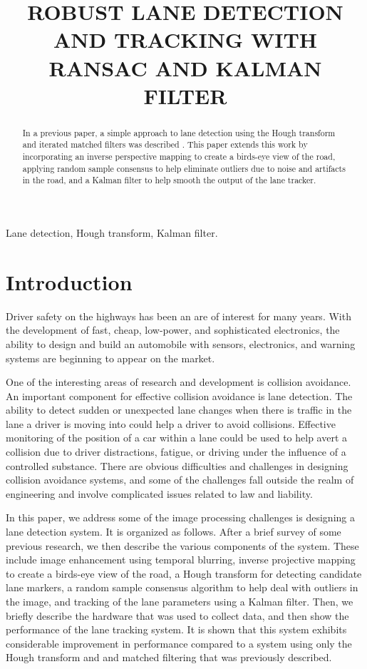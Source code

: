 \documentclass{article}
\title{ROBUST LANE DETECTION AND TRACKING WITH RANSAC AND KALMAN FILTER}
\begin{document}
%
\maketitle
%
\begin{abstract}
In a previous paper, a simple approach to lane detection using the Hough 
transform and iterated matched filters was described \cite{borkar_layered_2009}.
This paper extends this work by incorporating an inverse perspective mapping 
to create a birds-eye view of the road, applying random sample consensus to help 
eliminate outliers due to noise and artifacts in the road, and a Kalman filter
to help smooth the output of the lane tracker.
\end{abstract}
%
\begin{keywords}
Lane detection, Hough transform, Kalman filter.
\end{keywords}
%
\section{Introduction}
\label{sec:intro}
Driver safety on the highways has been an are of interest for many years.
With the development of fast, cheap, low-power, and sophisticated electronics,
the ability to design and build an automobile with sensors, electronics, and
warning systems are beginning to appear on the market.

One of the interesting areas of research and development is collision avoidance.
An important component for effective collision avoidance is lane detection.
The ability to detect sudden or unexpected lane changes when there
is traffic in the lane a driver is moving into could help a driver to avoid
collisions.
Effective monitoring of the position of a car within a lane could be used to 
help avert a collision due to driver distractions, fatigue, or driving under the influence of a controlled substance.
There are obvious difficulties and challenges in designing collision avoidance
systems, and some of the challenges fall outside the realm of engineering and
involve complicated issues related to law and liability.

In this paper, we address some of the image processing challenges is designing a 
lane detection system.  It is organized as follows.  
After a brief survey of some previous research, we then describe the various
components of the system.  These include image enhancement using temporal blurring,
inverse projective mapping to create a birds-eye view of the road, a Hough transform
for detecting candidate lane markers, a random sample consensus algorithm to 
help deal with outliers in the image, and tracking of the lane parameters using a Kalman filter. 
Then, we briefly describe the hardware that was used to collect data, and
then show the performance of the lane tracking system.
It is shown that this system exhibits considerable improvement in
performance compared to a system using only the Hough transform and and matched filtering that was previously described.
\end{document}

